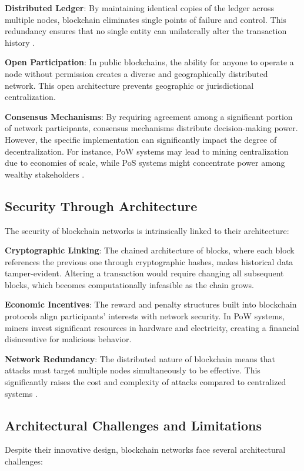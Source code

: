 \documentclass[twoside]{article}
\begin{document}
\textbf{Distributed Ledger}: By maintaining identical copies of the ledger across multiple nodes, blockchain eliminates single points of failure and control. This redundancy ensures that no single entity can unilaterally alter the transaction history \cite{patnaik}.

\textbf{Open Participation}: In public blockchains, the ability for anyone to operate a node without permission creates a diverse and geographically distributed network. This open architecture prevents geographic or jurisdictional centralization.

\textbf{Consensus Mechanisms}: By requiring agreement among a significant portion of network participants, consensus mechanisms distribute decision-making power. However, the specific implementation can significantly impact the degree of decentralization. For instance, PoW systems may lead to mining centralization due to economies of scale, while PoS systems might concentrate power among wealthy stakeholders \cite{reasearchgate}.

\subsection{Security Through Architecture}
The security of blockchain networks is intrinsically linked to their architecture:

\textbf{Cryptographic Linking}: The chained architecture of blocks, where each block references the previous one through cryptographic hashes, makes historical data tamper-evident. Altering a transaction would require changing all subsequent blocks, which becomes computationally infeasible as the chain grows.

\textbf{Economic Incentives}: The reward and penalty structures built into blockchain protocols align participants' interests with network security. In PoW systems, miners invest significant resources in hardware and electricity, creating a financial disincentive for malicious behavior.

\textbf{Network Redundancy}: The distributed nature of blockchain means that attacks must target multiple nodes simultaneously to be effective. This significantly raises the cost and complexity of attacks compared to centralized systems \cite{doi}.

\subsection{Architectural Challenges and Limitations}
Despite their innovative design, blockchain networks face several architectural challenges:
\end{document}
